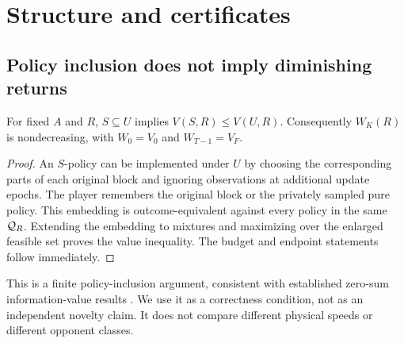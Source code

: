 \section{Structure and certificates}\label{sec:theory}

\subsection{Policy inclusion does not imply diminishing returns}
\begin{proposition}\label{prop:inclusion}
For fixed $A$ and $R$, $S\subseteq U$ implies $V(S,R)\le V(U,R)$.
Consequently $W_K(R)$ is nondecreasing, with $W_0=V_0$ and $W_{T-1}=V_F$.
\end{proposition}
\begin{proof}
An $S$-policy can be implemented under $U$ by choosing the corresponding
parts of each original block and ignoring observations at additional update
epochs. The player remembers the original block or the privately sampled
pure policy. This embedding is outcome-equivalent against every policy in
the same $\mathcal Q_R$. Extending the embedding to mixtures and maximizing over
the enlarged feasible set proves the value inequality. The budget and
endpoint statements follow immediately.
\end{proof}
This is a finite policy-inclusion argument, consistent with established
zero-sum information-value results \citep{hogeboom2020}. We use it as a
correctness condition, not as an independent novelty claim. It does not
compare different physical speeds or different opponent classes.

